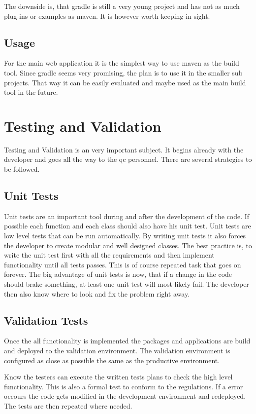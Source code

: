 \documentclass[paper=a4,twoside=false,BCOR=0mm,DIV=calc,fontsize=12pt]{scrartcl}
\begin{document}
The downside is, that gradle is still a very young project and has not as much plug-ins or examples as maven. It is however worth keeping in sight.

\subsection{Usage}
For the main web application it is the simplest way to use maven as the build tool. Since gradle seems very promising, the plan is to use it in the
smaller sub projects. That way it can be easily evaluated and maybe used as the main build tool in the future.


\section{Testing and Validation}
Testing and Validation is an very important subject. It begins already with the developer and goes all the way to the qc personnel.
There are several strategies to be followed.

\subsection{Unit Tests}
Unit tests are an important tool during and after the development of the code. If possible each function and each class should also have his unit test. 
Unit tests are low level tests that can be run automatically. By writing unit tests it also forces the developer to create modular and well designed classes.
The best practice is, to write the unit test first with all the requirements and then implement functionality until all tests passes. This is of course repeated task 
that goes on forever.
The big advantage of unit tests is now, that if a change in the code should brake something, at least one unit test will most likely fail.
The developer then also know where to look and fix the problem right away.

\subsection{Validation Tests}
Once the all functionality is implemented the packages and applications are build and deployed to the validation environment. The validation environment is configured as 
close as possible the same as the productive environment.

Know the testers can execute the written tests plans to check the high level functionality. This is also a formal test to conform to the regulations. If a error occours 
the code gets modified in the development environment and redeployed. The tests are then repeated where needed.
\end{document}
